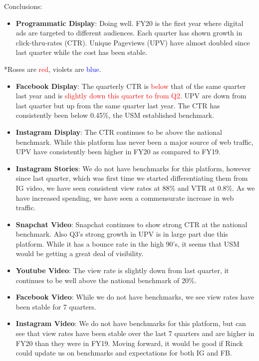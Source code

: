 \documentclass[
  11pt,
]{article}
\providecommand{\tightlist}{%
  \setlength{\itemsep}{0pt}\setlength{\parskip}{0pt}}
\begin{document}
Conclusions:

\begin{itemize}
\tightlist
\item
  \textbf{Programmatic Display}: Doing well. FY20 is the first year
  where digital ads are targeted to different audiences. Each quarter
  has shown growth in click-thru-rates (CTR). Unique Pageviews (UPV)
  have almost doubled since last quarter while the cost has been stable.
\end{itemize}

*Roses are \textcolor{red}{red}, violets are \textcolor{blue}{blue}.

\begin{itemize}
\item
  \textbf{Facebook Display}: The quarterly CTR is \textcolor{red}{below}
  that of the same quarter last year and is
  \textcolor{red}{slightly down this quarter to from Q2}. UPV are down
  from last quarter but up from the same quarter last year. The CTR has
  consistently been below 0.45\%, the USM established benchmark.
\item
  \textbf{Instagram Display}: The CTR continues to be above the national
  benchmark. While this platform has never been a major source of web
  traffic, UPV have consistently been higher in FY20 as compared to
  FY19.
\item
  \textbf{Instagram Stories}: We do not have benchmarks for this
  platform, however since last quarter, which was first time we started
  differentiating them from IG video, we have seen consistent view rates
  at 88\% and VTR at 0.8\%. As we have increased spending, we have seen
  a commensurate increase in web traffic.
\item
  \textbf{Snapchat Video}: Snapchat continues to show strong CTR at the
  national benchmark. Also Q3's strong growth in UPV is in large part
  due this platform. While it has a bounce rate in the high 90's, it
  seems that USM would be getting a great deal of visibility.
\item
  \textbf{Youtube Video}: The view rate is slightly down from last
  quarter, it continues to be well above the national benchmark of 20\%.
\item
  \textbf{Facebook Video}: While we do not have benchmarks, we see view
  rates have been stable for 7 quarters.
\item
  \textbf{Instagram Video}: We do not have benchmarks for this platform,
  but can see that view rates have been stable over the last 7 quarters
  and are higher in FY20 than they were in FY19. Moving forward, it
  would be good if Rinck could update us on benchmarks and expectations
  for both IG and FB.
\end{itemize}
\end{document}
